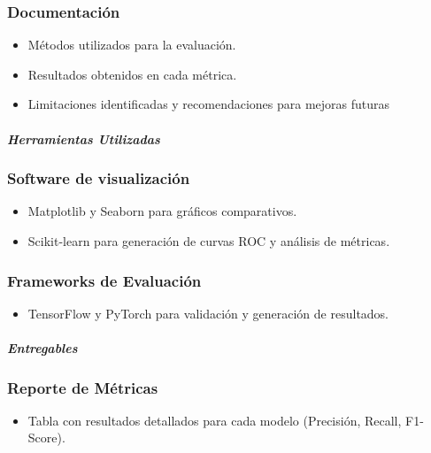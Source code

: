 \documentclass[listof=nochaptergap,12pt,times,authoryear]{report}
\begin{document}
\subsubsection{Documentación}
\begin{itemize}
    \item Métodos utilizados para la evaluación.
    \item Resultados obtenidos en cada métrica.
    \item Limitaciones identificadas y recomendaciones para mejoras futuras
\end{itemize}


\paragraph{\textit{Herramientas Utilizadas}}

\subsubsection{Software de visualización}
\begin{itemize}
    \item Matplotlib y Seaborn para gráficos comparativos.
    \item Scikit-learn para generación de curvas ROC y análisis de métricas.
\end{itemize}

\subsubsection{Frameworks de Evaluación}
\begin{itemize}
    \item TensorFlow y PyTorch para validación y generación de resultados.
\end{itemize}

\paragraph{\textit{Entregables}}

\subsubsection{Reporte de Métricas}
\begin{itemize}
    \item Tabla con resultados detallados para cada modelo (Precisión, Recall, F1-Score).
\end{itemize}
\end{document}
